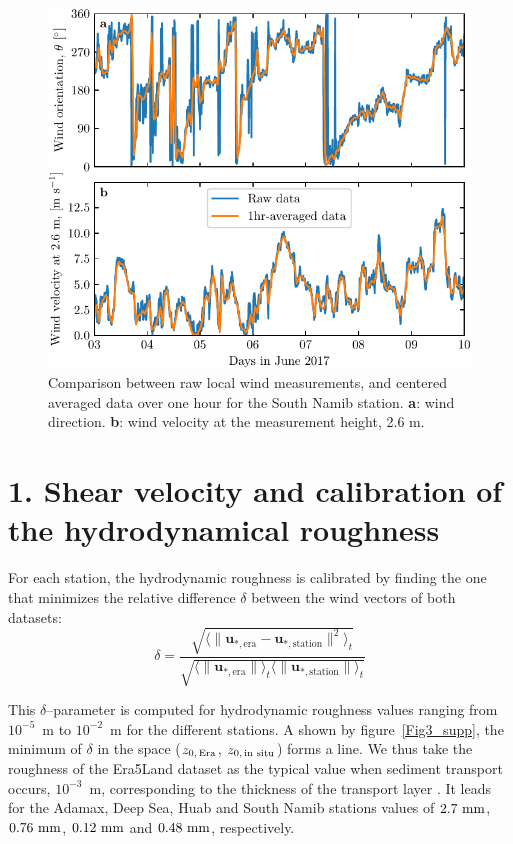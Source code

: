 \begin{figure}
  \centering
  \includegraphics[scale=1]{Figures/Figure2_supp.pdf}
  \caption{Comparison between raw local wind measurements, and centered averaged data over one hour for the South Namib station. \textbf{a}: wind direction. \textbf{b}: wind velocity at the measurement height, 2.6 m.}
  \label{Fig2_supp}
\end{figure}

\section*{1. Shear velocity and calibration of the hydrodynamical roughness}
\label{calib_z0}

For each station, the hydrodynamic roughness is calibrated by finding the one that minimizes the relative difference $\delta$ between the wind vectors of both datasets:
\begin{equation}
  \label{metric_roughness}
      \delta = \frac{\sqrt{\langle\| \boldsymbol{u}_{*, \textrm{era}} - \boldsymbol{u}_{*, \textrm{station}} \|^{2}\rangle_{t}}}{\sqrt{ \langle \| \boldsymbol{u}_{*, \textrm{era}} \| \rangle_{t}\langle \| \boldsymbol{u}_{*, \textrm{station}} \| \rangle_{t}}}
\end{equation}

This $\delta$--parameter is computed for hydrodynamic roughness values ranging from $10^{-5}$~m to $10^{-2}$~m for the different stations. A shown by figure~\ref{Fig3_supp}, the minimum of $\delta$ in the space ($z_{0,\, \textup{Era}}$, $z_{0,\, \textup{in situ}}$) forms a line. We thus take the roughness of the Era5Land dataset as the typical value when sediment transport occurs, $10^{-3}$~m, corresponding to the thickness of the transport layer \citep{Sherman2007}. It leads for the Adamax, Deep Sea, Huab and South Namib stations values of $2.7~\textup{mm}$, $0.76~\textup{mm}$, $0.12~\textup{mm}$ and $0.48~\textup{mm}$, respectively.

